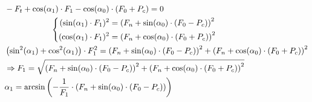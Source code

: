 \documentclass[12pt,a4paper]{report}
\begin{document}
\begin{align*}
    &-F_{t} + \cos(\alpha_1) \cdot F_1 - \cos(\alpha_0) \cdot (F_0 + P_c) = 0 \\
    &\hspace*{2cm}\left\{
    \begin{aligned}
        (\sin(\alpha_1) \cdot F_1)^2 &= \left(F_{n} + \sin(\alpha_0) \cdot (F_0 - P_c)\right)^2 \\
        (\cos(\alpha_1) \cdot F_1)^2 &= \left(F_{n} + \cos(\alpha_0) \cdot (F_0 + P_c)\right)^2
    \end{aligned}
    \right. \\
    &\left( \sin^2(\alpha_1) + \cos^2(\alpha_1) \right) \cdot F_1^2 =
    \left(F_{n} + \sin(\alpha_0) \cdot (F_0 - P_c)\right)^2 +
    \left(F_{n} + \cos(\alpha_0) \cdot (F_0 + P_c)\right)^2 \\
    &\Rightarrow F_1 = \sqrt{
        \left(F_{n} + \sin(\alpha_0) \cdot (F_0 - P_c)\right)^2 +
        \left(F_{n} + \cos(\alpha_0) \cdot (F_0 + P_c)\right)^2
    } \\
    &\alpha_1 = \arcsin\left(
        -\frac{1}{F_1} \cdot \left(F_{n} + \sin(\alpha_0) \cdot (F_0 - P_c)\right)
    \right)
\end{align*}
\end{document}
